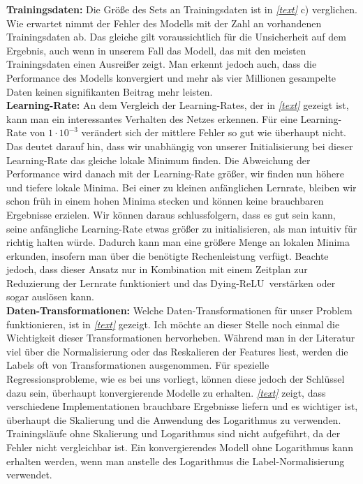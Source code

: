 \newline
\textbf{Trainingsdaten:}
Die Größe des Sets an Trainingsdaten ist in \textit{\autoref{text}} c) verglichen. Wie erwartet nimmt der Fehler des Modells mit der Zahl an vorhandenen Trainingsdaten ab. Das gleiche gilt voraussichtlich für die Unsicherheit auf dem Ergebnis, auch wenn in unserem Fall das Modell, das mit den meisten Trainingsdaten einen Ausreißer zeigt. Man erkennt jedoch auch, dass die Performance des Modells konvergiert und mehr als vier Millionen gesampelte Daten keinen signifikanten Beitrag mehr leisten. \\
\newline
\textbf{Learning-Rate:}
An dem Vergleich der Learning-Rates, der in \textit{\autoref{text}} gezeigt ist, kann man ein interessantes Verhalten des Netzes erkennen. Für eine Learning-Rate von $1 \cdot 10^{-3}$ verändert sich der mittlere Fehler so gut wie überhaupt nicht. Das deutet darauf hin, dass wir unabhängig von unserer Initialisierung bei dieser Learning-Rate das gleiche lokale Minimum finden. Die Abweichung der Performance wird danach mit der Learning-Rate größer, wir finden nun höhere und tiefere lokale Minima. Bei einer zu kleinen anfänglichen Lernrate, bleiben wir schon früh in einem hohen Minima stecken und können keine brauchbaren Ergebnisse erzielen. Wir können daraus schlussfolgern, dass es gut sein kann, seine anfängliche Learning-Rate etwas größer zu initialisieren, als man intuitiv für richtig halten würde. Dadurch kann man eine größere Menge an lokalen Minima erkunden, insofern man über die benötigte Rechenleistung verfügt. Beachte jedoch, dass dieser Ansatz nur in Kombination mit einem Zeitplan zur Reduzierung der Lernrate funktioniert und das \grqq Dying-ReLU\glqq~verstärken oder sogar auslösen kann. \\
\newline
\textbf{Daten-Transformationen:}
Welche Daten-Transformationen für unser Problem funktionieren, ist in \textit{\autoref{text}} gezeigt. Ich möchte an dieser Stelle noch einmal die Wichtigkeit dieser Transformationen hervorheben. Während man in der Literatur viel über die Normalisierung oder das Reskalieren der Features liest, werden die Labels oft von Transformationen ausgenommen. Für spezielle Regressionsprobleme, wie es bei uns vorliegt, können diese jedoch der Schlüssel dazu sein, überhaupt konvergierende Modelle zu erhalten. \textit{\autoref{text}} zeigt, dass verschiedene Implementationen brauchbare Ergebnisse liefern und es wichtiger ist, überhaupt die Skalierung und die Anwendung des Logarithmus zu verwenden. Trainingsläufe ohne Skalierung und Logarithmus sind nicht aufgeführt, da der Fehler nicht vergleichbar ist. Ein konvergierendes Modell ohne Logarithmus kann erhalten werden, wenn man anstelle des Logarithmus die Label-Normalisierung verwendet. \\
